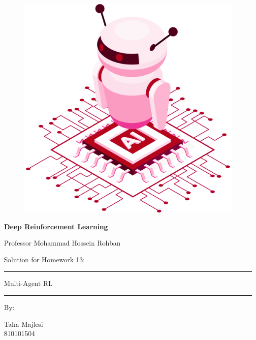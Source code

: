 \documentclass[12pt]{article}
\begin{document}
\thispagestyle{plain}

\begin{center}

\vspace*{-1.5cm}
\begin{figure}[!h]
    \centering
    \includegraphics[width=0.7\linewidth]{figs/cover-std.png}
\end{figure}

{

{\color{DarkBlue} {\fontsize{30}{50} \textbf{
Deep Reinforcement Learning
}}}

{\color{DarkBlue} {\Large
Professor Mohammad Hossein Rohban
}}
}


\vspace{20pt}

{

{\color{RedOrange}
{\Large
Solution for Homework 13:
}\\
}
{\color{BrickRed}
\rule{12cm}{0.5pt}

{\Huge
Multi-Agent RL

}
\rule{12cm}{0.5pt}
}

\vspace{10pt}

{\color{RoyalPurple} { \small By:} } \\
\vspace{10pt}

{\color{Blue} { \LARGE Taha Majlesi } } \\
\vspace{5pt}
{\color{RoyalBlue} { \Large 810101504 } }


}
\end{center}
\end{document}
